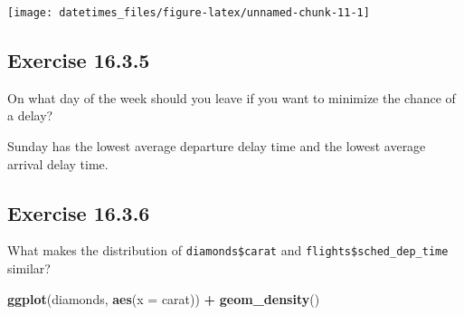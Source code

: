 \documentclass[]{book}
\newenvironment{Shaded}{\begin{snugshade}}{\end{snugshade}}
\newcommand{\CommentTok}[1]{\textcolor[rgb]{0.56,0.35,0.01}{\textit{#1}}}
\newcommand{\DataTypeTok}[1]{\textcolor[rgb]{0.13,0.29,0.53}{#1}}
\newcommand{\KeywordTok}[1]{\textcolor[rgb]{0.13,0.29,0.53}{\textbf{#1}}}
\newcommand{\NormalTok}[1]{#1}
\newcommand{\OperatorTok}[1]{\textcolor[rgb]{0.81,0.36,0.00}{\textbf{#1}}}
\newcommand{\OtherTok}[1]{\textcolor[rgb]{0.56,0.35,0.01}{#1}}
\newcommand{\StringTok}[1]{\textcolor[rgb]{0.31,0.60,0.02}{#1}}
\theoremstyle{plain}
\theoremstyle{remark}
\theoremstyle{definition}
\theoremstyle{definition}
\theoremstyle{definition}
\theoremstyle{remark}
\begin{document}
\begin{center}\texttt{[image: datetimes\_files/figure-latex/unnamed-chunk-11-1]} \end{center}

\hypertarget{exercise-16.3.5}{%
\subsection*{\texorpdfstring{Exercise
{16.3.5}}{Exercise 16.3.5}}\label{exercise-16.3.5}}

On what day of the week should you leave if you want to minimize the
chance of a delay?

Sunday has the lowest average departure delay time and the lowest
average arrival delay time.

\begin{Shaded}
\end{Shaded}

\hypertarget{exercise-16.3.6}{%
\subsection*{\texorpdfstring{Exercise
{16.3.6}}{Exercise 16.3.6}}\label{exercise-16.3.6}}

What makes the distribution of \texttt{diamonds\$carat} and
\texttt{flights\$sched\_dep\_time} similar?

\begin{Shaded}
\begin{Highlighting}[]
\KeywordTok{ggplot}\NormalTok{(diamonds, }\KeywordTok{aes}\NormalTok{(}\DataTypeTok{x =}\NormalTok{ carat)) }\OperatorTok{+}
\StringTok{  }\KeywordTok{geom_density}\NormalTok{()}
\end{Highlighting}
\end{Shaded}
\end{document}
